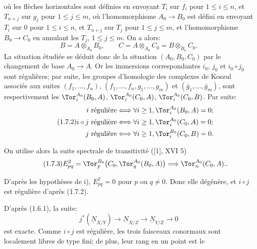 
où les
flèches horizontales sont définies en envoyant $T_i$ sur $f_i$ pour $1\leq i\leq n$, et $T_{n+j}$ sur $g_j$ pour $1\leq j\leq m$, où l'homomorphisme $A_0\longrightarrow B_0$ est défini en envoyant $T_i$ sur $0$ pour $1\leq i\leq n$, et $T_{n+j}$ sur $T_j$ pour $1\leq j\leq m$, et l'homomorphisme $B_0\longrightarrow C_0$ en annulant les $T_j$, $1\leq j\leq m$. On a alors:
\[
 B=A\otimes_{A_0}B_0,
 \qquad
 C=A\otimes_{A_0}C_0=B\otimes_{B_0}C_0.
\]
La situation étudiée se déduit donc de la situation $(A_0,B_0,C_0)$ par le changement de base $A_0\longrightarrow A$. Or les immersions correspondantes $i_0$, $j_0$ et $i_0\circ j_0$ sont régulières; par suite, les groupes d'homologie des complexes de Koszul associés aux suites $(f_1,\ldots,f_n)$, $(f_1,\ldots,f_n,g_1,\ldots,g_m)$ et $(\bar g_1,\ldots,\bar g_m)$, sont respectivement les $\Tor_i^{A_0}(B_0,A)$, $\Tor_i^{A_0}(C_0,A)$, $\Tor_i^{A_0}(C_0,B)$. Par suite:
\begin{equation}\tag{1.7.2}
\begin{aligned}
 i\ \text{régulière} &\Longleftrightarrow \forall i\geq1,
 \Tor_i^{A_0}(B_0,A)=0;\\
 i\circ j\ \text{régulière} &\Longleftrightarrow \forall i\geq1,
 \Tor_i^{A_0}(C_0,A)=0;\\
 j\ \text{régulière} &\Longleftrightarrow \forall i\geq1,
 \Tor_i^{B_0}(C_0,B)=0.
\end{aligned}
\end{equation}

On utilise alors la suite spectrale de transitivité ([1], XVI 5)
\begin{equation}\tag{1.7.3}
E^2_{pq}=\Tor_p^{B_0}\bigl(C_0,\Tor_q^{A_0}(B_0,A)\bigr)
\Longrightarrow \Tor_n^{A_0}(C_0,A)..
\end{equation}

D'après les hypothèses de i), $E^2_{pq}=0$ pour $p$ ou $q\ne0$. Donc elle dégénère, et $i\circ j$ est régulière d'après (1.7.2).

D'après (1.6.1), la suite:
\[
 j^*(\underline{N}_{X/Y})\longrightarrow \underline{N}_{X/Z}\longrightarrow \underline{N}_{Y/Z}\longrightarrow0
\]
est exacte. Comme $i\circ j$ est régulière, les trois faisceaux conormaux sont localement libres de type fini; de plus, leur rang en un point est le
